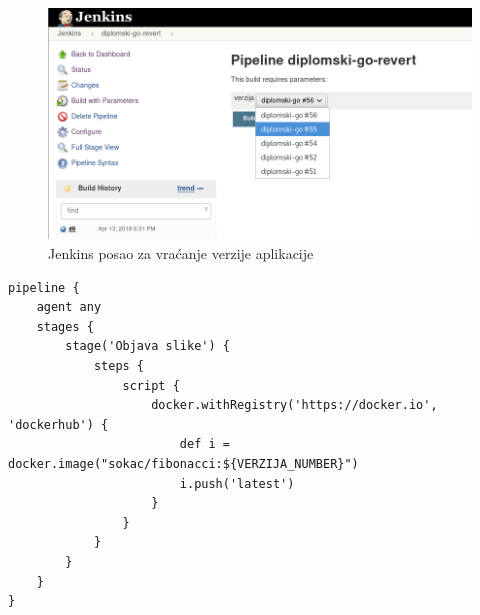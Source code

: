 \begin{figure}[h]
    \centering
    \includegraphics[width=\textwidth]{img/04/jenkins_rollback.png}
    \caption{Jenkins posao za vraćanje verzije aplikacije}%
    \label{fig:04jenkins_rollback}
\end{figure}

\begin{lstlisting}[float=h]
pipeline {
    agent any
    stages {
        stage('Objava slike') {
            steps {
                script {
                    docker.withRegistry('https://docker.io', 'dockerhub') {
                        def i = docker.image("sokac/fibonacci:${VERZIJA_NUMBER}")
                        i.push('latest')
                    }
                }
            }
        }
    }
}
\end{lstlisting}
